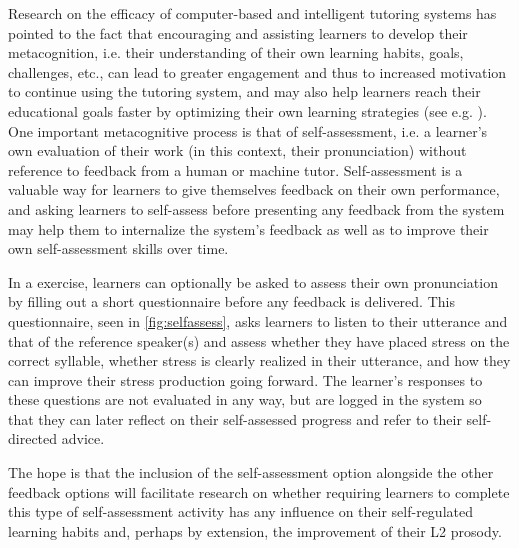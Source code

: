 		
		Research on the efficacy of computer-based and intelligent tutoring systems has  pointed to the fact that encouraging and assisting learners to develop their metacognition, i.e. their understanding of their own learning habits, goals, challenges, etc., can lead to greater engagement and thus to increased motivation to continue using the tutoring system, and may also help learners reach their educational goals faster by optimizing their own learning strategies (see e.g. \textcite{Long2011,Long2013}). One important metacognitive process is that of self-assessment, i.e. a learner's own evaluation of their work (in this context, their pronunciation) without reference to feedback from a human or machine tutor. Self-assessment is a valuable way for learners to give themselves feedback on their own performance, and asking learners to self-assess before presenting any feedback from the system may help them to internalize the system's feedback as well as to improve their own self-assessment skills over time. 
 
 	
 	In a  exercise, learners can optionally be asked to assess their own pronunciation by filling out a short questionnaire  before any feedback is delivered. This questionnaire, seen in \cref{fig:selfassess}, asks learners to listen to their utterance and that of the reference speaker(s) and assess whether they have placed stress on the correct syllable, whether stress is clearly realized in their utterance, and how they can improve their stress production going forward. The learner's responses to these questions are not evaluated in any way, but are logged in the system so that they can later reflect on their self-assessed progress and refer to their self-directed advice. 
 	
 	The hope is that the inclusion of the self-assessment option alongside the other feedback options will facilitate research on
 	whether requiring learners to complete this type of self-assessment activity has any influence on their self-regulated learning habits and, perhaps by extension, the improvement of their L2 prosody.
 	
